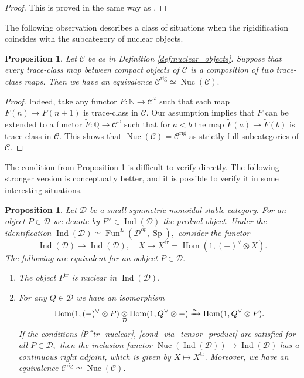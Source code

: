 \documentclass[11pt,leqno]{amsart}
\newtheorem{prop}[theo]{Proposition}
\numberwithin{equation}{section}
\def\N{\mathbb{N}}
\def\Q{\mathbb{Q}}
\def\wt{\widetilde}
\def\Hom{\operatorname{Hom}}
\newcommand{\tens}[1]{%
  \mathbin{\mathop{\otimes}\displaylimits_{#1}}%
}
\newcommand{\xto}{\xrightarrow}
\newcommand{\rig}{\operatorname{rig}}
\newcommand{\Nuc}{\operatorname{Nuc}}
\newcommand{\cD}{{\mathcal D}}
\newcommand{\cC}{{\mathcal C}}
\newcommand{\Fun}{\operatorname{Fun}}
\newcommand{\tr}{\operatorname{tr}}
\newcommand{\Sp}{\operatorname{Sp}}
\newcommand{\Ind}{\operatorname{Ind}}
\begin{document}
\begin{proof}
This is proved in the same way as \cite[Proposition 13.14]{CS20}. 
\end{proof}

The following observation describes a class of situations when the rigidification coincides with the subcategory of nuclear objects. 

\begin{prop}\label{prop:if_trace_class_can_be_decomposed}
Let $\cC$ be as in Definition \ref{def:nuclear_objects}. Suppose that every trace-class map between compact objects of $\cC$ is a composition of two trace-class maps. Then we have an equivalence $\cC^{\rig}\simeq\Nuc(\cC).$
\end{prop}

\begin{proof}
Indeed, take any functor $F:\N\to\cC^{\omega}$ such that each map $F(n)\to F(n+1)$ is trace-class in $\cC.$ Our assumption implies that $F$ can be extended to a functor $\wt{F}:\Q\to\cC^{\omega}$ such that for $a<b$ the map $\wt{F}(a)\to \wt{F}(b)$ is trace-class in $\cC.$ This shows that $\Nuc(\cC)=\cC^{\rig}$ as strictly full subcategories of $\cC.$ 
\end{proof}

The condition from Proposition \ref{prop:if_trace_class_can_be_decomposed} is difficult to verify directly. The following stronger version is conceptually better, and it is possible to verify it in some interesting situations.  

\begin{prop}\cite{And23, AM24} \label{prop:basic_conditions_good_rigidification}
Let $\cD$ be a small symmetric monoidal stable category. For an object $P\in\cD$ we denote by $P^{\vee}\in\Ind(\cD)$ the predual object. Under the identification $\Ind(\cD)\simeq \Fun^L(\cD^{op},\Sp),$ consider the functor
\begin{equation*}
\Ind(\cD)\to \Ind(\cD),\quad X\mapsto X^{\tr}=\Hom(1,(-)^{\vee}\otimes X).
\end{equation*}
The following are equivalent for an oobject $P\in\cD.$
\begin{enumerate}[label=(\roman*), ref=(\roman*)]
\item The object $P^{\tr}$ is nuclear in $\Ind(\cD).$ \label{P^tr_nuclear}
\item For any $Q\in\cD$ we have an isomorphism
\begin{equation}\label{eq:cond_via_tensor_product}
\Hom(1,(-)^{\vee}\otimes P)\tens{\cD}\Hom(1,Q^{\vee}\otimes -)\xto{\sim}\Hom(1,Q^{\vee}\otimes P). 
\end{equation} \label{cond_via_tensor_product}
If the conditions \ref{P^tr_nuclear}, \ref{cond_via_tensor_product} are satisfied for all $P\in\cD,$ then the inclusion functor $\Nuc(\Ind(\cD))\to\Ind(\cD)$ has a continuous right adjoint, which is given by $X\mapsto X^{\tr}.$ Moreover, we have an equivalence $\cC^{\rig}\simeq\Nuc(\cC).$
\end{enumerate}  
\end{prop}
\end{document}
